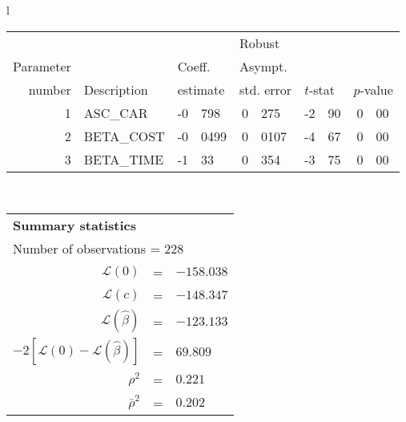   \begin{tabular}{l}
\begin{tabular}{rlr@{.}lr@{.}lr@{.}lr@{.}l}
         &                       &   \multicolumn{2}{l}{}    & \multicolumn{2}{l}{Robust}  &     \multicolumn{4}{l}{}   \\
Parameter &                       &   \multicolumn{2}{l}{Coeff.}      & \multicolumn{2}{l}{Asympt.}  &     \multicolumn{4}{l}{}   \\
number &  Description                     &   \multicolumn{2}{l}{estimate}      & \multicolumn{2}{l}{std. error}  &   \multicolumn{2}{l}{$t$-stat}  &   \multicolumn{2}{l}{$p$-value}   \\

\hline

1 & ASC\_CAR & -0&798 & 0&275 & -2&90 & 0&00 \\
2 & BETA\_COST & -0&0499 & 0&0107 & -4&67 & 0&00 \\
3 & BETA\_TIME & -1&33 & 0&354 & -3&75 & 0&00 \\
\hline

\end{tabular}
\\
\begin{tabular}{rcl}
\multicolumn{3}{l}{\bf Summary statistics}\\
\multicolumn{3}{l}{ Number of observations = $228$} \\
 $\mathcal{L}(0)$ &=&  $-158.038$ \\
 $\mathcal{L}(c)$ &=& $-148.347$\\
 $\mathcal{L}(\hat{\beta})$ &=& $-123.133 $  \\
 $-2[\mathcal{L}(0) -\mathcal{L}(\hat{\beta})]$ &=& $69.809$ \\
    $\rho^2$ &=&   $0.221$ \\
    $\bar{\rho}^2$ &=&    $0.202$ \\
\end{tabular}
\end{tabular}


